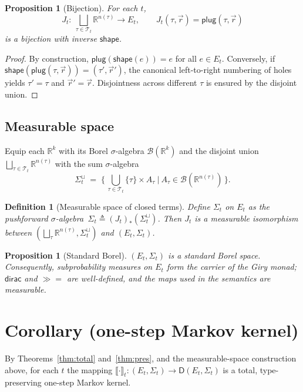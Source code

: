 \documentclass[11pt]{article}
\newtheorem{proposition}[theorem]{Proposition}
\newtheorem{definition}[theorem]{Definition}
\newcommand{\D}{\mathsf{D}}
\newcommand{\dirac}{\mathsf{dirac}}
\newcommand{\bind}{\mathbin{\gg\!=}}
\newcommand{\sem}[2][]{\llbracket #2 \rrbracket_{#1}}
\newcommand{\E}[1]{E_{#1}}
\newcommand{\RR}{\mathbb{R}}
\newcommand{\B}{\mathcal{B}}
\newcommand{\Tt}{\mathcal{T}}
\newcommand{\plug}{\mathsf{plug}}
\newcommand{\shape}{\mathsf{shape}}
\begin{document}
\begin{proposition}[Bijection]\label{prop:bij}
For each $t$,
\[
J_t:\ \bigsqcup_{\tau\in\Tt_t}\RR^{n(\tau)} \longrightarrow \E{t},\qquad J_t(\tau,\vec r)=\plug(\tau,\vec r)
\]
is a bijection with inverse $\shape$.
\end{proposition}
\begin{proof}
By construction, $\plug(\shape(e))=e$ for all $e\in \E{t}$.
Conversely, if $\shape(\plug(\tau,\vec r))=(\tau',\vec r')$, the canonical left-to-right numbering of holes yields $\tau'=\tau$ and $\vec r'=\vec r$.
Disjointness across different $\tau$ is ensured by the disjoint union.
\end{proof}

\subsection*{Measurable space}
Equip each $\RR^{k}$ with its Borel $\sigma$-algebra $\B(\RR^{k})$ and the disjoint union $\bigsqcup_{\tau\in\Tt_t}\RR^{n(\tau)}$ with the sum $\sigma$-algebra
\[
\Sigma^\sqcup_t \;=\; \bigl\{\, \bigcup_{\tau\in\Tt_t} \{\tau\}\times A_\tau \ \big|\ A_\tau\in \B(\RR^{n(\tau)}) \,\bigr\}.
\]
\begin{definition}[Measurable space of closed terms]\label{def:measspace}
Define $\Sigma_t$ on $\E{t}$ as the pushforward $\sigma$-algebra $\,\Sigma_t \triangleq (J_t)_{*}(\Sigma^\sqcup_t)$.
Then $J_t$ is a measurable isomorphism between $(\bigsqcup_{\tau}\RR^{n(\tau)},\Sigma^\sqcup_t)$ and $(\E{t},\Sigma_t)$.
\end{definition}

\begin{proposition}[Standard Borel]\label{prop:standard-borel}
$(\E{t},\Sigma_t)$ is a standard Borel space. Consequently, subprobability measures on $\E{t}$ form the carrier of the Giry monad; $\dirac$ and $\bind$ are well-defined, and the maps used in the semantics are measurable.
\end{proposition}

\section*{Corollary (one-step Markov kernel)}
By Theorems~\ref{thm:total} and~\ref{thm:pres}, and the measurable-space construction above, for each $t$ the mapping $\sem[t]{\cdot}:(\E{t},\Sigma_t)\to \D(\E{t},\Sigma_t)$ is a total, type-preserving one-step Markov kernel.
\end{document}
